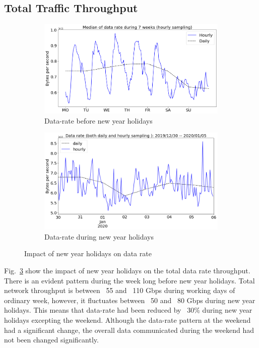 \documentclass[10pt, journal, letterpaper]{IEEEtran}
\newcommand\figSzeMahdi{0.8}
\begin{document}
\subsection{Total Traffic Throughput}
\begin{figure}[hbt!]
    \centering
    \begin{subfigure}{\figSzeMahdi\columnwidth}
          \centering
          \includegraphics[width=\columnwidth]{img/BCH_byterate.png}
          \caption{Data-rate before new year holidays}
          \label{fig:BCH_bps}
    \end{subfigure}
    \begin{subfigure}{\figSzeMahdi\columnwidth}
          \centering
          \includegraphics[width=\columnwidth]{img/CH2_byterate.png}
          \caption{Data-rate during new year holidays}
          \label{fig:CH_bps}
    \end{subfigure}
    \caption{Impact of new year holidays on data rate}
    \label{fig:datarate_BCH_CH}
\end{figure}
Fig.~\ref{fig:datarate_BCH_CH} show the impact of new year holidays on the total data rate throughput. There is an evident pattern during the week long before new year holidays. Total network throughput is between ~55 and ~110 Gbps during working days of ordinary week, however, it fluctuates between ~50 and ~80 Gbps during new year holidays. This means that data-rate had been reduced by ~30$\%$ during new year holidays excepting the weekend. Although the data-rate pattern at the weekend had a significant change, the overall data communicated during the weekend had not been changed significantly.
\end{document}
